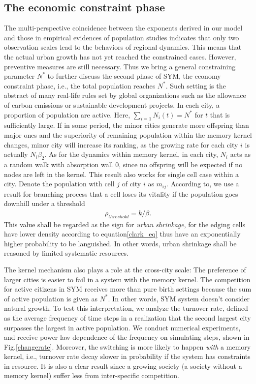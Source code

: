 \documentclass[reprint,unsortedaddress,amsmath,amssymb,aps,prl,showkeys]{revtex4-2}
\begin{document}
\subsection{The economic constraint phase}

The multi-perspective coincidence between the exponents derived in our model and those in empirical evidences of population studies indicates that only two observation scales lead to the behaviors of regional dynamics. This means that the actual urban growth has not yet reached the constrained cases. However, preventive measures are still necessary. Thus we bring a general constraining parameter $N^*$ to further discuss the second phase of SYM, the economy constraint phase, i.e., the total population reaches $N^*$. Such setting is the abstract of many real-life rules set by global organizations such as the allowance of carbon emissions or sustainable development projects. In each city, a proportion of population are active. Here, $\sum_{i=1} N_i(t) = N^*$ for $t$ that is sufficiently large. If in some period, the minor cities generate more offspring than major ones and the superiority of remaining population within the memory kernel changes, minor city will increase its ranking, as the growing rate for each city $i$ is actually $N_i\beta_2$. As for the dynamics within memory kernel, in each city, $N_i$ acts as a random walk with absorption wall $0$, since no offspring will be expected if no nodes are left in the kernel. This result also works for single cell case within a city. Denote the population with cell $j$ of city $i$ as $m_{ij}$. According to\@\cite{durrett1999essentials}, we use a result for branching process that a cell loses its vitality if the population goes downhill under a threshold \begin{align}\rho_{threshold} = k/\beta.\end{align} This value shall be regarded as the sign for \emph{urban shrinkage}, for the edging cells have lower density according to equation\@\ref{clark_eq} thus have an exponentially higher probability to be languished. In other words, urban shrinkage shall be reasoned by limited systematic resources. 

The kernel mechanism also plays a role at the cross-city scale: The preference of larger cities is easier to fail in a system with the memory kernel. The competition for active citizens in SYM receives more than pure birth settings because the sum of active population is given as $N^*$. In other words, SYM system doesn't consider natural growth. To test this interpretation, we analyze the turnover rate, defined as the average frequency of time steps in a realization that the second largest city surpasses the largest in active population. We conduct numerical experiments, and receive power law dependence of the frequency on simulating steps, shown in Fig.\@\ref{changerate}. Moreover, the switching is more likely to happen \textit{with} a memory kernel, i.e., turnover rate decay slower in probability if the system has constraints in resource. It is also a clear result since a growing society (a society without a memory kernel) suffer less from inter-specific competition.
\end{document}
